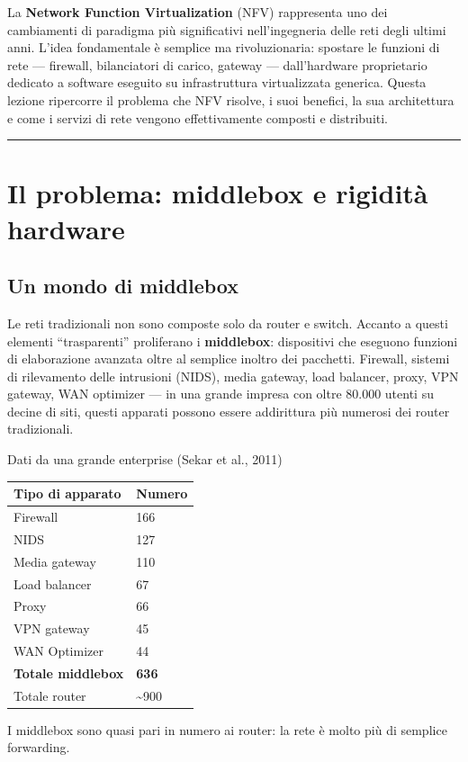 \documentclass[
  italian,
  openany]{book}
\newcounter{none} %
\begin{document}
La \textbf{Network Function Virtualization} (NFV) rappresenta uno dei
cambiamenti di paradigma più significativi nell'ingegneria delle reti
degli ultimi anni. L'idea fondamentale è semplice ma rivoluzionaria:
spostare le funzioni di rete --- firewall, bilanciatori di carico,
gateway --- dall'hardware proprietario dedicato a software eseguito su
infrastruttura virtualizzata generica. Questa lezione ripercorre il
problema che NFV risolve, i suoi benefici, la sua architettura e come i
servizi di rete vengono effettivamente composti e distribuiti.

\begin{center}\rule{0.5\linewidth}{0.5pt}\end{center}

\section{Il problema: middlebox e rigidità
hardware}\label{il-problema-middlebox-e-rigidituxe0-hardware}

\subsection{Un mondo di middlebox}\label{un-mondo-di-middlebox}

Le reti tradizionali non sono composte solo da router e switch. Accanto
a questi elementi ``trasparenti'' proliferano i \textbf{middlebox}:
dispositivi che eseguono funzioni di elaborazione avanzata oltre al
semplice inoltro dei pacchetti. Firewall, sistemi di rilevamento delle
intrusioni (NIDS), media gateway, load balancer, proxy, VPN gateway, WAN
optimizer --- in una grande impresa con oltre 80.000 utenti su decine di
siti, questi apparati possono essere addirittura più numerosi dei router
tradizionali.

\begin{callouttip}{Dati da una grande enterprise (Sekar et al., 2011)}

{\def\LTcaptype{none} %
\begin{longtable}[]{@{}ll@{}}
\toprule\noalign{}
Tipo di apparato & Numero \\
\midrule\noalign{}
\endhead
\bottomrule\noalign{}
\endlastfoot
Firewall & 166 \\
NIDS & 127 \\
Media gateway & 110 \\
Load balancer & 67 \\
Proxy & 66 \\
VPN gateway & 45 \\
WAN Optimizer & 44 \\
\textbf{Totale middlebox} & \textbf{636} \\
Totale router & \textasciitilde900 \\
\end{longtable}
}

I middlebox sono quasi pari in numero ai router: la rete è molto più di
semplice forwarding.

\end{callouttip}
\end{document}
